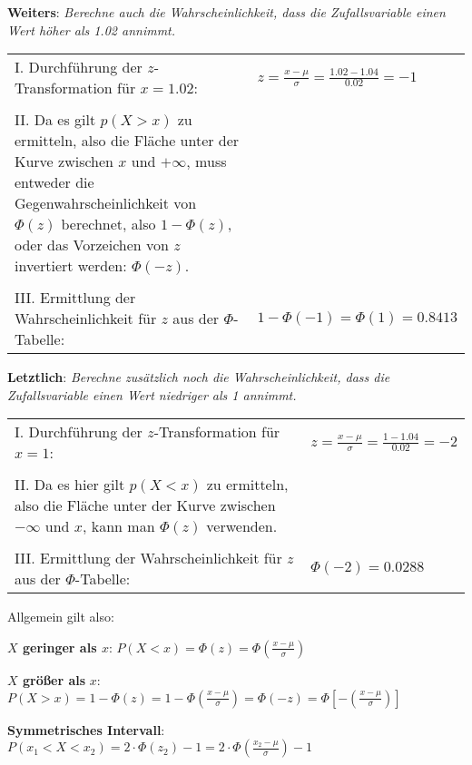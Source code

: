 \textbf{Weiters}: \emph{Berechne auch die Wahrscheinlichkeit, dass die Zufallsvariable einen Wert h\"{o}her als 1.02 annimmt.}

\begin{table}[h!]
	\begin{tabular}{p{10cm} l}
	I. Durchf\"{u}hrung der $z$-Transformation f\"{u}r $x = 1.02$: & $z = \frac{x - \mu}{\sigma} = \frac{1.02 - 1.04}{0.02} = -1$
	\\ & \\
	II. Da es gilt $p(X > x)$ zu ermitteln, also die Fl\"{a}che unter der Kurve zwischen $x$ und $+\infty$, muss entweder die Gegenwahrscheinlichkeit von $\Phi(z)$ berechnet, also $1 - \Phi(z)$, oder das Vorzeichen von $z$ invertiert werden: $\Phi(-z)$. &
	\\ & \\
	III. Ermittlung der Wahrscheinlichkeit f\"{u}r $z$ aus der $\Phi$-Tabelle: & $1 - \Phi(-1) = \Phi(1) = 0.8413$
	\end{tabular}
\end{table}

\textbf{Letztlich}: \emph{Berechne zus\"{a}tzlich noch die Wahrscheinlichkeit, dass die Zufallsvariable einen Wert niedriger als 1 annimmt.}

\begin{table}[h!]
	\begin{tabular}{p{10cm} l}
	I. Durchf\"{u}hrung der $z$-Transformation f\"{u}r $x = 1$: & $z = \frac{x - \mu}{\sigma} = \frac{1 - 1.04}{0.02} = -2$
	\\ & \\
	II. Da es hier gilt $p(X < x)$ zu ermitteln, also die Fl\"{a}che unter der Kurve zwischen $-\infty$ und $x$, kann man $\Phi(z)$ verwenden. &
	\\ & \\
	III. Ermittlung der Wahrscheinlichkeit f\"{u}r $z$ aus der $\Phi$-Tabelle: & $\Phi(-2) = 0.0288$
	\end{tabular}
\end{table}

Allgemein gilt also: 

\textbf{$X$ geringer als $x$}: $P(X < x) = \Phi(z) = \Phi\left(\frac{x - \mu}{\sigma}\right)$

\textbf{$X$ gr\"{o}\ss{}er als} $x$: $P(X > x) = 1 - \Phi(z) = 1 - \Phi\left(\frac{x - \mu}{\sigma}\right) = \Phi(-z) = \Phi\left[-\left(\frac{x - \mu}{\sigma}\right)\right]$

\textbf{Symmetrisches Intervall}: $P(x_{1} < X < x_{2}) = 2 \cdot \Phi(z_{2}) - 1 = 2 \cdot \Phi\left(\frac{x_{2} - \mu}{\sigma}\right) - 1$

